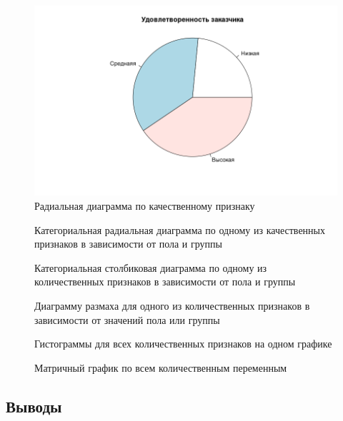 \begin{figure}[H]
	\centering
	\includegraphics[width=\linewidth]{fig2}
	\caption{Радиальная диаграмма по качественному признаку}
\end{figure}

\begin{figure}[H]
	\centering
	
	\caption{Категориальная радиальная диаграмма по одному из качественных признаков в зависимости от пола и группы}
\end{figure}

\begin{figure}[H]
	\centering
	
	\caption{Категориальная столбиковая диаграмма по одному из количественных признаков в зависимости от пола и группы}
\end{figure}

\begin{figure}[H]
	\centering
	
	\caption{Диаграмму размаха для одного из количественных признаков в зависимости от значений пола или группы}
\end{figure}

\begin{figure}[H]
	\centering
	
	\caption{Гистограммы для всех количественных признаков на одном графике}
\end{figure}

\begin{figure}[H]
	\centering
	
	\caption{Матричный график по всем количественным переменным}
\end{figure}

\subsection{Выводы}














